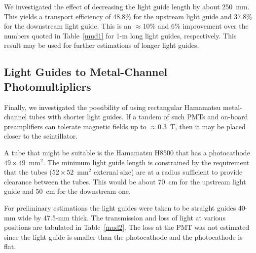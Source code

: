We investigated the effect of decreasing the light guide length by about 
250~mm.  This yields a transport efficiency of 48.8\% for the upstream 
light guide and 37.8\% for the downstream light guide.  This is an 
$\approx$10\% and 6\% improvement over the numbers quoted in Table~\ref{mud1} 
for 1-m long light guides, respectively.  This result may be used for further 
estimations of longer light guides.

\subsection{Light Guides to Metal-Channel Photomultipliers}
\label{mu9}

Finally, we investigated the possibility of using rectangular Hamamatsu 
metal-channel tubes with shorter light guides.  If a tandem of such PMTs  
and on-board preamplifiers can tolerate magnetic fields up to $\approx$0.3~T, 
then it may be placed closer to the scintillator.

A tube that might be suitable is the Hamamatsu H8500 that has a photocathode 
$49\times49$~mm$^2$.  The minimum light guide length is constrained by the 
requirement that the tubes ($52\times52$~mm$^2$ external size) are at a radius 
sufficient to provide clearance between the tubes.  This would be about 
70~cm for the upstream light guide and 50~cm for the downstream one.

For preliminary estimations the light guides were taken to be straight guides 
40-mm wide by 47.5-mm thick.  The transmission and loss of light at various 
positions are tabulated in Table~\ref{mud2}.  The loss at the PMT was not 
estimated since the light guide is smaller than the photocathode and the 
photocathode is flat.

